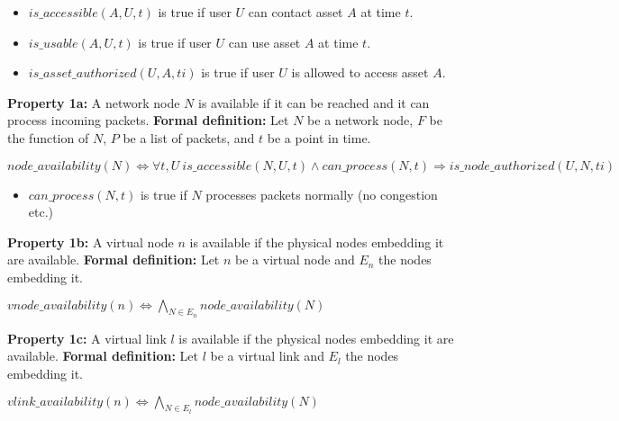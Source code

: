 \begin{itemize}
\item $is\_accessible(A,U,t)$ is true if user $U$ can contact asset $A$ at time $t$.
\item $is\_usable(A,U,t)$ is true if user $U$ can use asset $A$ at time $t$.
\item $is\_asset\_authorized(U,A,ti)$ is true if user $U$ is allowed to access asset $A$.
\end{itemize}

\textbf{Property 1a:} A network node $N$ is available if it can be reached and it can process incoming packets.
\newline
\textbf{Formal definition:} Let $N$ be a network node, $F$ be the function of $N$, $P$ be a list of packets, and $t$ be a point in time.

\begin{myformula}
$node\_availability(N) \Leftrightarrow \forall t,U~ is\_accessible(N,U,t) \wedge can\_process(N,t) \Rightarrow is\_node\_authorized(U,N,ti)$
\end{myformula}

\begin{itemize}
\item $can\_process(N,t)$ is true if $N$ processes packets normally (\eg no congestion etc.)
\end{itemize} 

\textbf{Property 1b:} A virtual node $n$ is available if the physical nodes embedding it are available.
\newline
\textbf{Formal definition:} Let $n$ be a virtual node and $E_n$ the nodes embedding it.

\begin{myformula}
$vnode\_availability(n) \Leftrightarrow \bigwedge\limits_{N \in E_n} node\_availability(N)$
\end{myformula}

\textbf{Property 1c:} A virtual link $l$ is available if the physical nodes embedding it are available.
\newline
\textbf{Formal definition:} Let $l$ be a virtual link and $E_l$ the nodes embedding it.

\begin{myformula}
$vlink\_availability(n) \Leftrightarrow \bigwedge\limits_{N \in E_l} node\_availability(N)$
\end{myformula}

